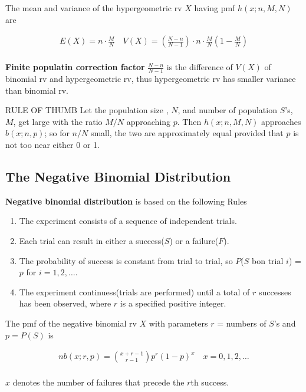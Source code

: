 \begin{proposition}
    The mean and variance of the hypergeometric rv $X$ having pmf $h(x;n,M,N)$ are 

    \begin{align*}
        E(X) = n\cdot\frac{M}{N}\quad V(X) = \left(\frac{N-n}{N-1}\right)\cdot n\cdot\frac{M}{N}\left(1-\frac{M}{N}\right)\\
    \end{align*}

    \textbf{Finite populatin correction factor} $\frac{N-n}{N-1}$ is the difference of $V(X)$ of binomial rv and hypergeometric rv, thus hypergeometric rv has smaller variance than binomial rv.
\end{proposition}

\begin{theorem}{RULE OF THUMB}
    Let the population size , $N$, and number of population $S$'s, $M$, get large with the ratio $M/N$ approaching $p$. Then $h(x;n,M,N)$ approaches $b(x;n,p)$; so for $n/N$ small, the two are approximately equal provided that $p$ is not too near either 0 or 1. 
\end{theorem}

\subsection{The Negative Binomial Distribution}

\begin{proposition}
    \textbf{Negative binomial distribution} is based on the following Rules

    \begin{enumerate}
        \item The experiment consists of a sequence of independent trials.
        \item Each trial can result in either a success($S$) or a failure($F$).
        \item The probability of success is constant from trial to trial, so $P$($S$ bon trial $i$) = $p$ for $i = 1, 2, \dots$.
        \item The experiment continuess(trials are performed) until a total of $r$ successes has been observed, where $r$ is a specified positive integer.
    \end{enumerate}
\end{proposition}

\begin{proposition}
    The pmf of the negative binomial rv $X$ with parameters $r$ = numbers of $S$'s and $p = P(S)$ is
    
    \begin{align*}
        nb(x;r,p) = {x+r-1\choose r-1} p^r(1-p)^x\quad x=0,1,2,\dots \\
    \end{align*}

    $x$ denotes the number of failures that precede the $r$th success.
\end{proposition}


